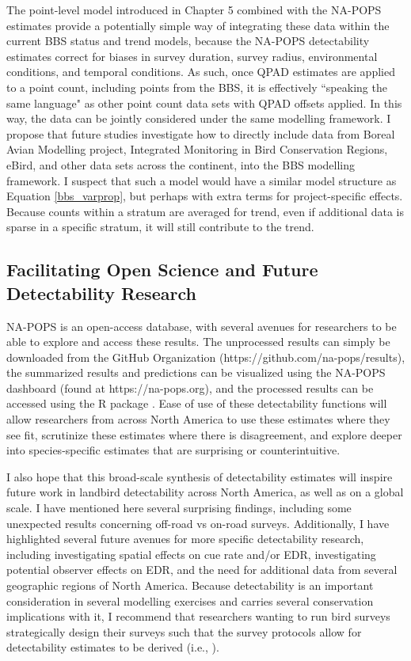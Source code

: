 The point-level model introduced in Chapter 5 combined with the NA-POPS estimates provide a potentially simple way of integrating these data within the current BBS status and trend models, because the NA-POPS detectability estimates correct for biases in survey duration, survey radius, environmental conditions, and temporal conditions.
As such, once QPAD \citep{solymos_calibrating_2013} estimates are applied to a point count, including points from the BBS, it is effectively ``speaking the same language" as other point count data sets with QPAD offsets applied.
In this way, the data can be jointly considered under the same modelling framework.
I propose that future studies investigate how to directly include data from Boreal Avian Modelling project, Integrated Monitoring in Bird Conservation Regions, eBird, and other data sets across the continent, into the BBS modelling framework.
I suspect that such a model would have a similar model structure as Equation \ref{bbs_varprop}, but perhaps with extra terms for project-specific effects.
Because counts within a stratum are averaged for trend, even if additional data is sparse in a specific stratum, it will still contribute to the trend.

\subsection{Facilitating Open Science and Future Detectability Research}

\par NA-POPS is an open-access database, with several avenues for researchers to be able to explore and access these results. The unprocessed results can simply be downloaded from the GitHub Organization (https://github.com/na-pops/results), the summarized results and predictions can be visualized using the NA-POPS dashboard (found at https://na-pops.org), and the processed results can be accessed using the R package  \citep{edwards_napops_2024}. Ease of use of these detectability functions will allow researchers from across North America to use these estimates where they see fit, scrutinize these estimates where there is disagreement, and explore deeper into species-specific estimates that are surprising or counterintuitive.

\par I also hope that this broad-scale synthesis of detectability estimates will inspire future work in landbird detectability across North America, as well as on a global scale. I have mentioned here several surprising findings, including some unexpected results concerning off-road vs on-road surveys. Additionally, I have highlighted several future avenues for more specific detectability research, including investigating spatial effects on cue rate and/or EDR, investigating potential observer effects on EDR, and the need for additional data from several geographic regions of North America. Because detectability is an important consideration in several modelling exercises and carries several conservation implications with it, I recommend that researchers wanting to run bird surveys strategically design their surveys such that the survey protocols allow for detectability estimates to be derived (i.e., \citet{matsuoka_reviving_2014}). 

